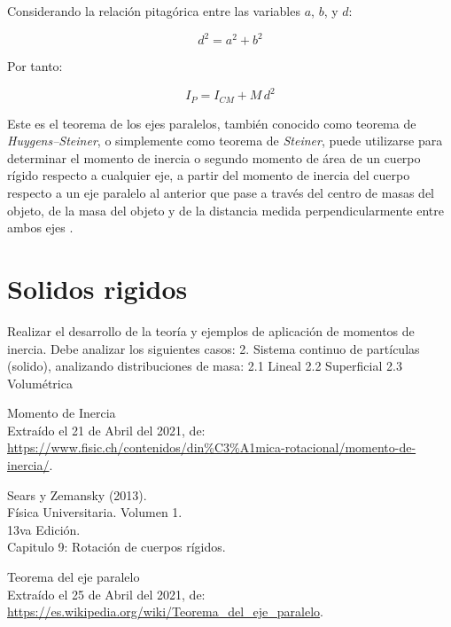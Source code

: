\documentclass[letter,twoside,11pt]{article}
\begin{document}
Considerando la relación pitagórica entre las variables $a$, $b$, y $d$:

\begin{equation*}
    d^2 = a^2 + b^2
\end{equation*}

Por tanto:

\begin{equation}
    I_{P} = I_{CM} + M\, d^2
\end{equation}

Este es el teorema de los ejes paralelos, también conocido como teorema de 
\emph{Huygens–Steiner}, o simplemente como teorema de \emph{Steiner}, puede
utilizarse para determinar el momento de inercia o segundo momento de área de
un cuerpo rígido respecto a cualquier eje, a partir del momento de inercia del
cuerpo respecto a un eje paralelo al anterior que pase a través del centro de
masas del objeto, de la masa del objeto y de la distancia medida
perpendicularmente entre ambos ejes \cite{WIKI1}.

\section{Solidos rigidos}
Realizar el desarrollo de la teoría y ejemplos de aplicación de
momentos de inercia. Debe analizar los siguientes casos:
2. Sistema continuo de partículas (solido), analizando distribuciones de masa:
2.1 Lineal
2.2 Superficial
2.3 Volumétrica


\begin{thebibliography}{99}

 Momento de Inercia \\
Extraído el 21 de Abril del 2021, de: \\
\url{https://www.fisic.ch/contenidos/din%C3%A1mica-rotacional/momento-de-inercia/}.
 
 Sears y Zemansky (2013).\\
Física Universitaria. Volumen 1.\\
13va Edición.\\
Capitulo 9: Rotación de cuerpos rígidos.

 Teorema del eje paralelo \\
Extraído el 25 de Abril del 2021, de: \\
\url{https://es.wikipedia.org/wiki/Teorema_del_eje_paralelo}.

\end{thebibliography}
\end{document}
